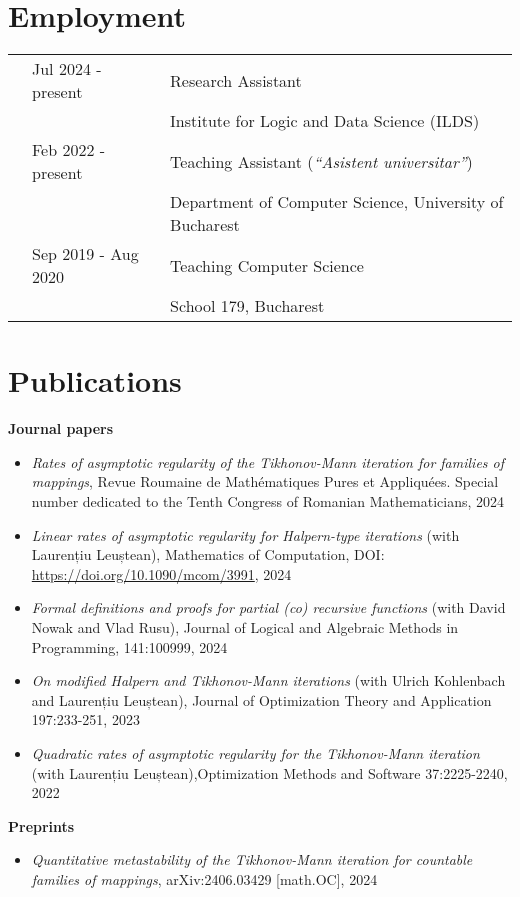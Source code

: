\documentclass[letterpaper,11pt,oneside]{article}
\begin{document}
\noindent
\section{Employment}
\normalsize
\begin{tabular}{@{} l l l}
        & Jul 2024 - present & Research Assistant \\ 
        &                    & Institute for Logic and Data Science (ILDS) \\
        & Feb 2022 - present & Teaching Assistant (\textit{``Asistent universitar''}) \\ 
        &                & Department of Computer Science, University of Bucharest \\
        & Sep 2019 - Aug 2020    & Teaching Computer Science \\
        &                & School 179, Bucharest 
\end{tabular}


\noindent
\section{Publications} 
\large\textbf{Journal papers}
\normalsize
\begin{itemize}
    \item \emph{Rates of asymptotic regularity of the Tikhonov-Mann iteration for families of mappings}, {Revue Roumaine de Math\'{e}matiques Pures et Appliqu\'{e}es. Special number dedicated to the Tenth Congress of Romanian Mathematicians}, 2024
    \item \emph{Linear rates of asymptotic regularity for Halpern-type iterations} (with Laurențiu Leuștean), Mathematics of Computation, DOI: \url{https://doi.org/10.1090/mcom/3991}, 2024
    \item \emph{Formal definitions and proofs for partial (co) recursive functions} (with David Nowak and Vlad Rusu), Journal of Logical and Algebraic Methods in Programming, 141:100999, 2024
    \item \emph{On modified Halpern and Tikhonov-Mann iterations} (with Ulrich Kohlenbach and Laurențiu Leuștean), Journal of Optimization Theory and Application 197:233-251, 2023
    \item \emph{Quadratic rates of asymptotic regularity for the Tikhonov-Mann iteration} (with Laurențiu Leuștean),Optimization Methods and Software 37:2225-2240, 2022
\end{itemize}
\large\textbf{Preprints}
\begin{itemize}
    \item \emph{Quantitative metastability of the Tikhonov-Mann iteration for countable families of mappings}, 	arXiv:2406.03429 [math.OC], 2024
\end{itemize}
\mbox{} 
\end{document}
